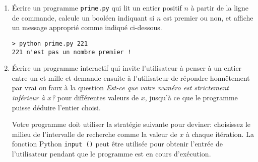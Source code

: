 \documentclass[a4paper]{article}
\begin{document}
\begin{enumerate}
\begin{verbatim}
   *
  ***
 *****
*******
\end{verbatim}

\item Écrire un programme {\tt prime.py} qui lit un entier positif $n$ à partir de la ligne de commande, calcule un booléen
 indiquant si $n$ est premier ou non, et affiche un message approprié comme indiqué ci-dessous.
\begin{verbatim}
> python prime.py 221
221 n'est pas un nombre premier !
\end{verbatim}

\item Écrire un programme interactif qui invite l'utilisateur à penser à un entier entre un et mille
et demande ensuite à l'utilisateur de répondre honnêtement par vrai ou faux à la question {\it Est-ce que votre numéro est strictement inférieur  à $x$? } pour différentes valeurs de $x$, jusqu'à ce que le programme puisse déduire l'entier choisi.

Votre programme doit utiliser la stratégie suivante pour deviner: choisissez le milieu de l'intervalle de recherche comme
la valeur de $x$ à chaque itération. La fonction Python {\tt input ()} peut être utilisée pour obtenir l'entrée de l'utilisateur pendant que le programme est en cours d'exécution.

\end{enumerate}
\end{document}
